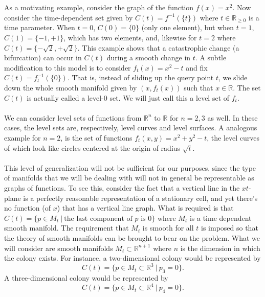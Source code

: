 \\
\\
As a motivating example, consider the graph of the function $f(x) = x^2$. Now consider the time-dependent set given by $C(t) = f^{-1} (\{t\})$ where $t \in \mathbb{R}_{\geq 0}$ is a time parameter. When $t=0$, $C(0) = \{ 0\}$ (only one element), but when $t=1$, $C(1) = \{ -1, +1  \}$, which has two elements, and, likewise for $t=2$ where $C(t) = \{ -\sqrt{2}, +\sqrt{2}  \}$. This example shows that a catastrophic change (a bifurcation) can occur in $C(t)$ during a smooth change in $t$. A subtle modification to this model is to consider $f_t(x) = x^2-t$ and fix $C(t) = f^{-1}_t(\{0 \})$. That is, instead of sliding up the query point $t$, we slide down the whole smooth manifold given by $(x,f_t(x))$ such that $x \in \mathbb{R}$. The set $C(t)$ is actually called a level-$0$ set. We will just call this a level set of $f_t$.
\\
\\
We can consider level sets of functions from $\mathbb{R}^n$ to $\mathbb{R}$ for $n = 2,3$ as well. In these cases, the level sets are, respectively, level curves and level surfaces. A analogous example for $n=2$, is the set of functions $f_t(x,y) = x^2+y^2-t$, the level curves of which look like circles centered at the origin of radius $\sqrt{t}$.
\\
\\
This level of generalization will not be sufficient for our purposes, since the type of manifolds that we will be dealing with will not in general be representable as graphs of functions. To see this, consider the fact that a vertical line in the $xt$-plane is a perfectly reasonable representation of a stationary cell, and yet there's no function (of $x$) that has a vertical line graph. What is required is that $C(t) = \{ p \in M_t \ | \ \textrm{the last component of $p$ is $0$} \}$ where $M_t$ is a time dependent smooth manifold. The requirement that $M_t$ is smooth for all $t$ is imposed so that the theory of smooth manifolds can be brought to bear on the problem. What we will consider are smooth manifolds $M_t \subset \mathbb{R}^{n+1}$ where $n$ is the dimension in which the colony exists. For instance, a two-dimensional colony would be represented by
\begin{equation}
        C(t) = \{ p \in M_t \subset \mathbb{R}^3 \ | \ p_3 = 0  \}.
\end{equation}
A three-dimensional colony would be represented by
\begin{equation}
        C(t) = \{ p \in M_t \subset \mathbb{R}^4 \ | \ p_4 = 0  \}.
\end{equation}
